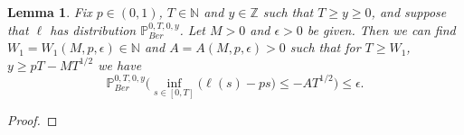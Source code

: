 \documentclass[12pt]{article}
\newtheorem{lemma}{Lemma}
\begin{document}
	\begin{lemma}\label{LemmaMinFreeS4} Fix $p \in (0,1)$, $T \in \mathbb{N}$ and $y\in \mathbb{Z}$ such that $T \geq y \geq 0$, and suppose that $\ell$ has distribution $\mathbb{P}^{0,T,0,y}_{Ber}$. Let $M > 0$ and $\epsilon > 0$ be given. Then we can find $W_1=W_1(M,p, \epsilon) \in \mathbb{N}$ and $A=A(M,p, \epsilon) > 0$ such that for $T \geq W_1$, $ y \geq p T -  MT^{1/2}$ we have
		\begin{equation}\label{minFree1S4}
		\mathbb{P}^{0,T,0,y}_{Ber}\Big( \inf_{s \in [ 0, T]}\big( \ell(s) -  ps \big) \leq -AT^{1/2} \Big) \leq \epsilon.
		\end{equation}
	\end{lemma}
	
	\begin{proof}
		

\end{proof}
\end{document}
